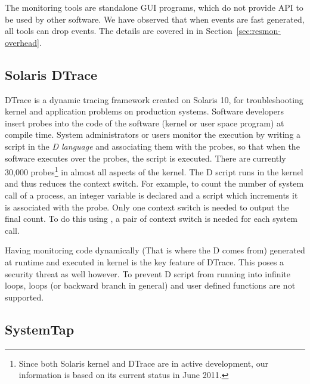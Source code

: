 The monitoring tools are standalone GUI programs, which do not
provide API to be used by other software.
We have observed that when events are fast generated, all tools
can drop events.
The details are covered in in Section~\ref{sec:resmon-overhead}.

\subsection{Solaris DTrace}
\label{sec:dtrace}

DTrace\cite{cantrill2004dynamic} is a dynamic tracing framework
created on Solaris 10, for troubleshooting kernel and application problems
on production systems.
Software developers insert probes into the code of the software
(kernel or user space program) at compile time.
System administrators or users monitor the execution by writing
a script in the {\em D language} and associating them with the probes,
so that when the software executes over the probes, the script is executed.
There are currently 30,000  probes\footnote{
Since both Solaris kernel and DTrace are in active development,
our information is based on its current status in June 2011.}
in almost all aspects of the kernel.
The D script runs in the kernel and thus reduces the context switch.
For example, to count the number of  system call of a process,
an integer variable is declared and a script which increments it
is associated with the  probe.
Only one context switch is needed to output the final count.
To do this using , a pair of context switch is
needed for each  system call.

Having monitoring code dynamically (That is where the D comes from)
generated at runtime and executed in kernel is the key feature of
DTrace.
This poses a security threat as well however.
To prevent D script from running into infinite loops,
loops (or backward branch in general) and user defined functions
are not supported.


\subsection{SystemTap}
\label{sec:systemtap}

